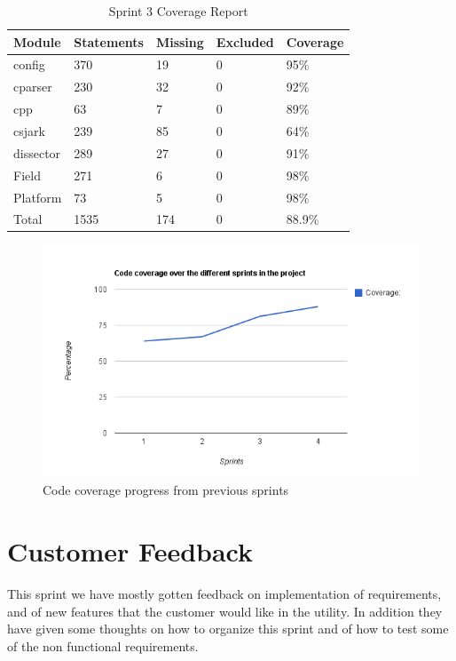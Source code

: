 \begin{table}[!htb]\footnotesize\center
	\caption{Sprint 3 Coverage Report\label{tab:sp4CoverageReport}}
	\begin{tabular}{l l l l l}
		\toprule
		Module & Statements & Missing & Excluded & Coverage\\
		\midrule
		config & 370 & 19 & 0 & 95\%\ \\
		cparser & 230 & 32 & 0 & 92\%\ \\
		cpp & 63 & 7 & 0 & 89\%\ \\
		csjark & 239 & 85 & 0 & 64\%\ \\
		dissector & 289 & 27 & 0 & 91\%\ \\
		Field & 271 & 6  & 0 & 98\%\ \\
		Platform & 73 & 5 & 0 & 98\%\ \\
		Total & 1535 & 174 & 0 & 88.9\%\ \\
		\bottomrule
	\end{tabular}
\end{table}

\begin{figure}[ht]
	\center
	\includegraphics[width=\textwidth]{./sprints/img/sprint4_code_coverage_chart.png}
	\caption{Code coverage progress from previous sprints\label{fig:sp4CoverageChart}}
\end{figure}





\section{Customer Feedback}
\label{sec:sp4feedback}
This sprint we have mostly gotten feedback on implementation of requirements, and of new features that the customer would like in the utility. In addition they have given some thoughts on how to organize this sprint and of how to test some of the non functional requirements.
